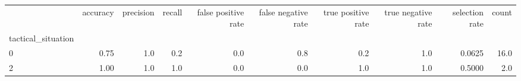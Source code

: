 \begin{tabular}{lrrrrrrrrr}
\toprule
{} &  accuracy &  precision &  recall &  false positive rate &  false negative rate &  true positive rate &  true negative rate &  selection rate &  count \\
tactical\_situation &           &            &         &                      &                      &                     &                     &                 &        \\
\midrule
0                  &      0.75 &        1.0 &     0.2 &                  0.0 &                  0.8 &                 0.2 &                 1.0 &          0.0625 &   16.0 \\
2                  &      1.00 &        1.0 &     1.0 &                  0.0 &                  0.0 &                 1.0 &                 1.0 &          0.5000 &    2.0 \\
\bottomrule
\end{tabular}
